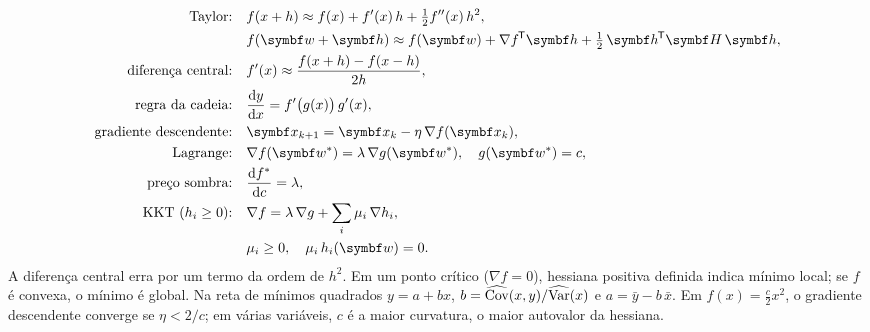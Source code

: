 \begin{align*}
\text{Taylor:}\quad & f(x+h) \approx f(x) + f'(x)\,h + \tfrac12 f''(x)\,h^2 , \\
& f(\vetor{w} + \vetor{h}) \approx f(\vetor{w}) + \nabla f\T\vetor{h} + \tfrac12\,\vetor{h}\T\vetor{H}\,\vetor{h} , \\
\text{diferença central:}\quad & f'(x) \approx \frac{f(x+h) - f(x-h)}{2h} , \\
\text{regra da cadeia:}\quad & \frac{\dd y}{\dd x} = f'\big(g(x)\big)\,g'(x) , \\
\text{gradiente descendente:}\quad & \vetor{x}_{k+1} = \vetor{x}_k - \eta\,\nabla f(\vetor{x}_k) , \\
\text{Lagrange:}\quad & \nabla f(\vetor{w}^{\ast}) = \lambda\,\nabla g(\vetor{w}^{\ast}) , \quad g(\vetor{w}^{\ast}) = c , \\
\text{preço sombra:}\quad & \frac{\dd f^{\ast}}{\dd c} = \lambda , \\
\text{KKT ($h_i \ge 0$):}\quad & \nabla f = \lambda\,\nabla g + \sum_i \mu_i\,\nabla h_i , \\
& \mu_i \ge 0 , \quad \mu_i\,h_i(\vetor{w}) = 0 .
\end{align*}
A diferença central erra por um termo da ordem de $h^2$. Em um ponto crítico ($\nabla f = 0$), hessiana positiva definida indica mínimo local; se $f$ é convexa, o mínimo é global. Na reta de mínimos quadrados $y = a + bx$, $b = \widehat{\operatorname{Cov}}(x, y)/\widehat{\operatorname{Var}}(x)$ e $a = \bar y - b\,\bar x$. Em $f(x) = \tfrac{c}{2}x^2$, o gradiente descendente converge se $\eta < 2/c$; em várias variáveis, $c$ é a maior curvatura, o maior autovalor da hessiana.

